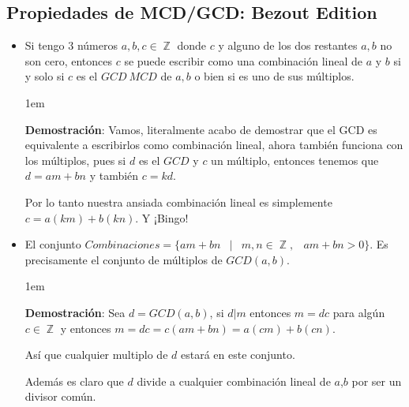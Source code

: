 \documentclass[12pt, fleqn]{report}                             %
\newenvironment{SmallIndentation}[1][0.75em]                    %
    {\begin{adjustwidth}{#1}{}\begin{footnotesize}}                 %
    {\end{footnotesize}\end{adjustwidth}}                           %
\DeclareMathOperator \Space {\quad}                             %
\DeclareMathOperator \MiniSpace {\;}                            %
\newcommand \Such {\MiniSpace|\MiniSpace}                       %
\DeclareMathOperator \Integers  {\mathbb{Z}}                     %
\begin{document}
        \subsection{Propiedades de MCD/GCD: Bezout Edition}
            \begin{itemize}

                \item Si tengo 3 números $a, b, c \in \Integers$ donde $c$ y alguno de los
                dos restantes $a,b$ no son cero, entonces $c$ se puede escribir como
                una combinación lineal de $a$ y $b$ si y solo si $c$ es el $GCD \ MCD$ de
                $a, b$ o bien si es uno de sus múltiplos.

                    \begin{SmallIndentation}[1em]
                        \textbf{Demostración}:
                            Vamos, literalmente acabo de demostrar que el GCD es equivalente
                            a escribirlos como combinación lineal, ahora también funciona con
                            los múltiplos, pues si $d$ es el $GCD$ y $c$ un múltiplo, entonces
                            tenemos que $d=am+bn$ y también $c=kd$.

                            Por lo tanto nuestra ansiada combinación lineal es simplemente
                            $c=a(km)+b(kn)$. Y ¡Bingo!

                    \end{SmallIndentation} 


                \item El conjunto 
                    $Combinaciones = \{ am+bn \Such m, n \in \Integers, \MiniSpace am+bn > 0 \}$.
                    Es precisamente el conjunto de múltiplos de $GCD(a,b)$.

                    \begin{SmallIndentation}[1em]
                        \textbf{Demostración}:
                            Sea $d=GCD(a,b)$, si $d|m$ entonces $m = dc$ para algún $c \in \Integers$
                            y entonces $m = dc = c(am+bn)=a(cm)+b(cn)$.

                            Así que cualquier multiplo de $d$ estará en este conjunto.

                            Además es claro que $d$ divide a cualquier combinación lineal
                            de $a$,$b$ por ser un divisor común.


\end{SmallIndentation}
\end{itemize}
\end{document}

